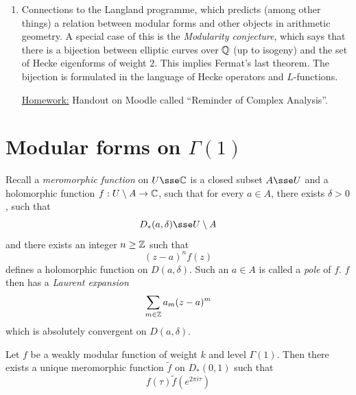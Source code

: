\documentclass{article}
\begin{document}
\begin{enumerate}
    A \emph{Dirichlet \(L\)-series} is a function of the form
    \[\sum_{n \ge 1}a_n n^{-s}\]
    which has similar properties is called an \(L\)-function. Modular forms can be used to construct interesting examples of \(L\)-functions. Take \(M_k(\Gamma)\) and decompose them under the action of Hecke operators. In particular, if \(\Gamma = \Gamma(1)\), we get a decomposition into lines, called Hecke eigenforms.
    \item Connections to the Langland programme, which predicts (among other things) a relation between modular forms and other objects in arithmetic geometry. A special case of this is the \emph{Modularity conjecture}, which says that there is a bijection between elliptic curves over \(\mathbb{Q}\) (up to isogeny) and the set of Hecke eigenforms of weight \(2\). This implies Fermat's last theorem. The bijection is formulated in the language of Hecke operators and \(L\)-functions.
    
    \underline{Homework:} Handout on Moodle called ``Reminder of Complex Analysis''.
\end{enumerate}

\lec

\section{Modular forms on \(\Gamma(1)\)}

Recall a \emph{meromorphic function} on \(U \sse \C\) is a closed subset \(A \sse U\) and a holomorphic function \(f : U \setminus A \to \mathbb{C}\), such that for every \(a \in A\), there exists \(\delta > 0\), such that
\[D_*(a, \delta) \sse U \setminus A\]
and there exists an integer \(n \ge \mathbb{Z}\) such that
\[(z-a)^nf(z)\]
defines a holomorphic function on \(D(a, \delta)\). Such an \(a \in A\) is called a \emph{pole} of \(f\). \(f\) then has a \emph{Laurent expansion}
\[\sum_{m \in \mathbb{Z}}a_m(z-a)^m\]
which is absolutely convergent on \(D(a, \delta)\).

\begin{lemma}
    Let \(f\) be a weakly modular function of weight \(k\) and level \(\Gamma(1)\). Then there exists a unique meromorphic function \(\tilde f\) on \(D_*(0, 1)\) such that
    \[f(\tau) \tilde f(e^{2\pi i \tau})\]
\end{lemma}
\end{document}
